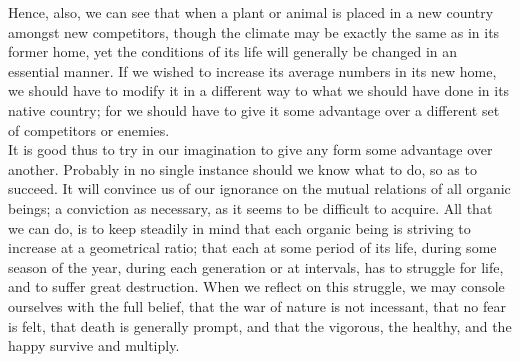\indent Hence, also, we can see that when a plant or animal is placed in a new country amongst new competitors, though the climate may be exactly the same as in its former home, yet the conditions of its life will generally be changed in an essential manner. If we wished to increase its average numbers in its new home, we should have to modify it in a different way to what we should have done in its native country; for we should have to give it some advantage over a different set of competitors or enemies.\\
\indent It is good thus to try in our imagination to give any form some advantage over another. Probably in no single instance should we know what to do, so as to succeed. It will convince us of our ignorance on the mutual relations of all organic beings; a conviction as necessary, as it seems to be difficult to acquire. All that we can do, is to keep steadily in mind that each organic being is striving to increase at a geometrical ratio; that each at some period of its life, during some season of the year, during each generation or at intervals, has to struggle for life, and to suffer great destruction. When we reflect on this struggle, we may console ourselves with the full belief, that the war of nature is not incessant, that no fear is felt, that death is generally prompt, and that the vigorous, the healthy, and the happy survive and multiply.